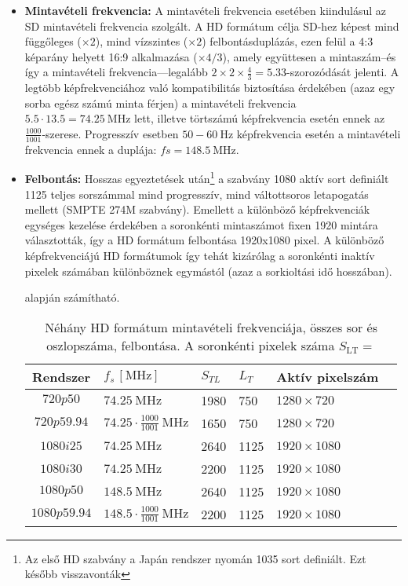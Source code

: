 \begin{itemize}
\item \textbf{Mintavételi frekvencia:}
A mintavételi frekvencia esetében kiindulásul az SD mintavételi frekvencia szolgált.
A HD formátum célja SD-hez képest mind függőleges ($\times 2$), mind vízszintes ($\times 2$) felbontásduplázás, ezen felül a 4:3 képarány helyett 16:9 alkalmazása ($\times 4/3$), amely együttesen a mintaszám--és így a mintavételi frekvencia---legalább $2\times 2 \times \frac{4}{3} = 5.33$-szorozódását jelenti.
A legtöbb képfrekvenciához való kompatibilitás biztosítása érdekében (azaz egy sorba egész számú minta férjen) a mintavételi frekvencia $5.5 \cdot 13.5 = 74.25~\mathrm{MHz}$ lett, illetve törtszámú képfrekvencia esetén ennek az $\frac{1000}{1001}$-szerese.
Progresszív esetben $50-60~\mathrm{Hz}$ képfrekvencia esetén a mintavételi frekvencia ennek a duplája: $fs = 148.5~\mathrm{MHz}$.
\item \textbf{Felbontás:} Hosszas egyeztetések után\footnote{Az első HD szabvány a Japán rendszer nyomán 1035 sort definiált. Ezt később visszavonták} a szabvány 1080 aktív sort definiált 1125 teljes sorszámmal mind progresszív, mind váltottsoros letapogatás mellett (SMPTE 274M szabvány).
Emellett a különböző képfrekvenciák egységes kezelése érdekében a soronkénti mintaszámot fixen 1920 mintára választották, így a HD formátum felbontása 1920x1080 pixel.
A különböző képfrekvenciájú HD formátumok így tehát kizárólag a soronkénti inaktív pixelek számában különböznek egymástól (azaz a sorkioltási idő hosszában).

\begin{table}[h!]
\caption{Néhány HD formátum mintavételi frekvenciája, összes sor és oszlopszáma, felbontása. 
A soronkénti pixelek száma $S_{\mathrm{LT}} = $} alapján számítható.
\renewcommand*{\arraystretch}{2.25}
\label{tab:viewing_dist}
\begin{center}
    \begin{tabular}[h!]{ @{}c | l | l | l | l | l @{} }%
		Rendszer     &   $f_s \, [\mathrm{MHz}]$ 				& $S_{TL}$ & $L_T$ & Aktív pixelszám \\ \hline
		$720p50$     &   $74.25~\mathrm{MHz}$    				& 1980     &  750  & $1280 \times 720$ \\
		$720p59.94$  &$74.25\cdot\frac{1000}{1001}~\mathrm{MHz}$& 1650     &  750  & $1280 \times 720$ \\
		$1080i25$ 	 &   $74.25~\mathrm{MHz}$    				& 2640     & 1125  & $1920 \times 1080$ \\
		$1080i30$  	 &   $74.25~\mathrm{MHz}$    				& 2200     & 1125  & $1920 \times 1080$ \\
		$1080p50$ 	 &   $148.5~\mathrm{MHz}$    		    	& 2640     & 1125  & $1920 \times 1080$ \\
		$1080p59.94$ &$148.5\cdot\frac{1000}{1001}~\mathrm{MHz}$& 2200     & 1125  & $1920 \times 1080$ 
        \end{tabular}
\end{center}
\end{table}


\end{itemize}
